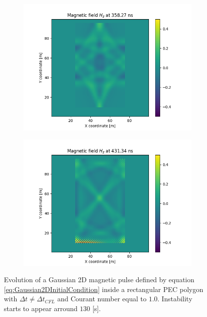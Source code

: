\documentclass[12pt, oneside]{book}
\begin{document}
\begin{figure}[H]
    \begin{subfigure}[b]{0.45\textwidth}
        \centering
        \includegraphics[width=\textwidth]{Imagenes/CFDTD2D_GaussianInstability3.png}
    \end{subfigure}
    \begin{subfigure}[b]{0.45\textwidth}
        \centering
        \includegraphics[width=\textwidth]{Imagenes/CFDTD2D_GaussianInstability4.png}
    \end{subfigure}
    \caption{Evolution of a Gaussian 2D magnetic pulse defined by equation \ref{eq:Gaussian2DInitialCondition} inside a rectangular PEC polygon with $\Delta t \neq \Delta t_{CFL}$ and Courant number equal to $1.0$. Instability starts to appear arround $130$ [s].}
    \label{fig:CFDTD2D_GaussianInstability}
\end{figure}
\end{document}
